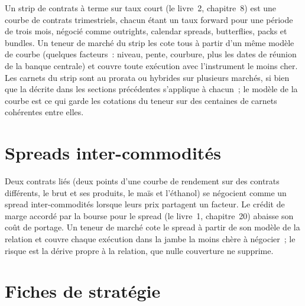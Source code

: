 Un strip de contrats à terme sur taux court (le livre~2, chapitre~8) est une courbe de contrats trimestriels, chacun étant un taux forward pour une période de trois mois, négocié
comme outrights, calendar spreads, butterflies, packs et bundles. Un teneur de marché du strip les cote tous à partir d'un même modèle de courbe (quelques
facteurs~: niveau, pente, courbure, plus les dates de réunion de la banque centrale) et couvre toute exécution avec l'instrument le moins cher. Les carnets du strip
sont au prorata ou hybrides sur plusieurs marchés, si bien que la  décrite dans les sections précédentes s'applique à chacun~; le modèle de la courbe est ce qui garde
les cotations du teneur sur des centaines de carnets cohérentes entre elles.

\section{Spreads inter-commodités}

Deux contrats liés (deux points d'une courbe de rendement sur des contrats différents, le brut et ses produits, le maïs et l'éthanol) se négocient comme un
spread inter-commodités lorsque leurs prix partagent un facteur. Le crédit de marge accordé par la bourse pour le spread (le livre~1, chapitre~20) abaisse son coût de
portage. Un teneur de marché cote le spread à partir de son modèle de la relation et couvre chaque exécution dans la jambe la moins chère à négocier~; le risque est la
dérive propre à la relation, que nulle couverture ne supprime.

\section{Fiches de stratégie}

